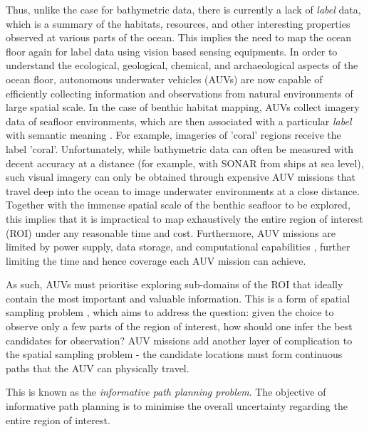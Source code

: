 		Thus, unlike the case for bathymetric data, there is currently a lack of \textit{label} data, which is a summary of the habitats, resources, and other interesting properties observed at various parts of the ocean. This implies the need to map the ocean floor again for label data using vision based sensing equipments. In order to understand the ecological, geological, chemical, and archaeological aspects of the ocean floor, autonomous underwater vehicles (AUVs) are now capable of efficiently collecting information and observations from natural environments of large spatial scale. In the case of benthic habitat mapping, AUVs collect imagery data of seafloor environments, which are then associated with a particular \textit{label} with semantic meaning \citep{Steinberg2015128}. For example, imageries of 'coral' regions receive the label 'coral'. Unfortunately, while bathymetric data can often be measured with decent accuracy at a distance (for example, with SONAR from ships at sea level), such visual imagery can only be obtained through expensive AUV missions that travel deep into the ocean to image underwater environments at a close distance. Together with the immense spatial scale of the benthic seafloor to be explored, this implies that it is impractical to map exhaustively the entire region of interest (ROI) under any reasonable time and cost. Furthermore, AUV missions are limited by power supply, data storage, and computational capabilities \citep{AsherBender}, further limiting the time and hence coverage each AUV mission can achieve. 
		
		As such, AUVs must prioritise exploring sub-domains of the ROI that ideally contain the most important and valuable information. This is a form of spatial sampling problem \citep{Rigby:ROB20372}, which aims to address the question: given the choice to observe only a few parts of the region of interest, how should one infer the best candidates for observation? AUV missions add another layer of complication to the spatial sampling problem - the candidate locations must form continuous paths that the AUV can physically travel.
		
		This is known as the \textit{informative path planning problem}. The objective of informative path planning is to minimise the overall uncertainty regarding the entire region of interest.
		

